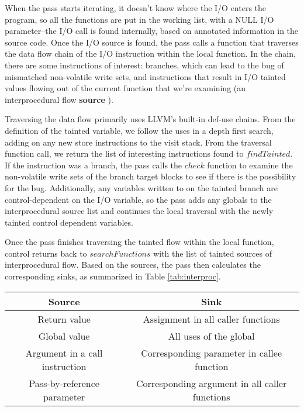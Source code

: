 When the pass starts iterating, it doesn't know where the I/O enters the program, so all the functions are put in the working list, with a NULL I/O parameter--the I/O call is found internally, based on annotated information in the source code. Once the I/O source is found, the pass calls a function that traverses the data flow chain of the I/O instruction within the local function. In the chain, there are some instructions of interest: branches, which can lead to the bug of mismatched non-volatile write sets, and instructions that result in I/O tainted values flowing out of the current function that we're examining (an interprocedural flow {\bf source} ). 
	
Traversing the data flow primarily uses LLVM's built-in def-use chains. From the definition of the tainted variable, we follow the uses in a depth first search, adding on any new store instructions to the visit stack. 
From the traversal function call, we return the list of interesting instructions found to $findTainted$. If the instruction was a branch, the pass calls the $check$ function to examine the non-volatile write sets of the branch target blocks to see if there is the possibility for the bug. Additionally, any variables written to on the tainted branch are control-dependent on the I/O variable, so the pass adds any globals to the interprocedural source list and continues the local traversal with the newly tainted control dependent variables.

Once the pass finishes traversing the tainted flow within the local function, control returns back to $searchFunctions$ with the list of tainted sources of interprocedural flow. Based on the sources, the pass then calculates the corresponding sinks, as summarized in Table \ref{tab:interproc}.

\begin{table*}[]
\centering
\begin{tabular}{|c|c|}
\toprule
Source & Sink\\ 
\midrule
Return value & Assignment in all caller functions \\
Global value & All uses of the global \\
Argument in a call instruction & Corresponding parameter in callee function \\
Pass-by-reference parameter & Corresponding argument in all caller functions \\
\bottomrule
\end{tabular}
\caption{Interprocedural flow sources and sinks}
\label{tab:interproc}
\end{table*}
	
